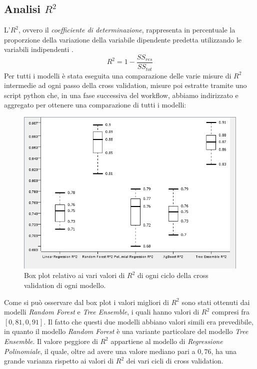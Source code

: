 \documentclass[12pt, a4paper, twocolumn]{article} %
\begin{document}
\subsection{Analisi $R^{2}$}
L'$R^{2}$, ovvero il \textit{coefficiente di determinazione}, rappresenta in percentuale la proporzione della variazione della variabile dipendente predetta utilizzando le variabili indipendenti \cite{r2}.\[R^{2} = 1 - \frac{SS_{res}}{SS_{tot}}\]
Per tutti i modelli è stata eseguita una comparazione delle varie misure di $R^{2}$ intermedie ad ogni passo della cross validation, misure poi estratte tramite uno script python che, in una fase successiva del workflow, abbiamo indirizzato e aggregato per ottenere una comparazione di tutti i modelli:
\begin{figure}[H]
  \includegraphics[scale=0.5]{./Immagini/boxplot-r2.png}
  \caption{Box plot relativo ai vari valori di $R^{2}$ di ogni ciclo della cross validation di ogni modello.}
\end{figure}
Come si può osservare dal box plot i valori migliori di $R^{2}$ sono stati ottenuti dai modelli \textit{Random Forest} e \textit{Tree Ensemble}, i quali hanno valori di $R^{2}$ compresi fra $[0,81, 0,91]$. Il fatto che questi due modelli abbiano valori simili era prevedibile, in quanto il modello \textit{Random Forest} è una variante particolare del modello \textit{Tree Ensemble}. Il valore peggiore di $R^{2}$ appartiene al modello di \textit{Regressione Polinomiale}, il quale, oltre ad avere una valore mediano pari a $0,76$, ha una grande varianza rispetto ai valori di $R^{2}$ dei vari cicli di cross validation. 
\end{document}
